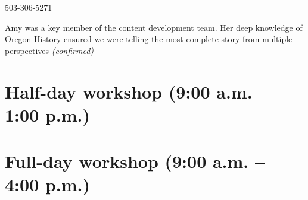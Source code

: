 \documentclass{report}
\begin{document}
                503-306-5271\newline

                Amy was a key member of the content development team. Her deep knowledge of Oregon History ensured we were telling the most complete story from multiple perspectives
                \emph{ (confirmed) }
              
        
    \newpage
    \chapter*{ Half-day workshop (9:00 a.m. – 1:00 p.m.) }

      
        
        
    \newpage
    \chapter*{ Full-day workshop (9:00 a.m. – 4:00 p.m.) }

      
        
        
\end{document}
